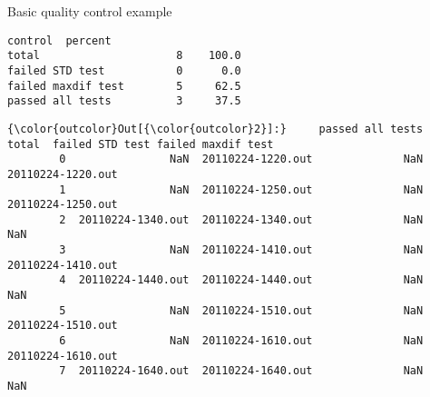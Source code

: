 \documentclass[11pt]{article}
\begin{document}
\begin{block}{Basic quality control example}
\begin{Verbatim}[commandchars=\\\{\}]
                    control  percent
total                     8    100.0
failed STD test           0      0.0
failed maxdif test        5     62.5
passed all tests          3     37.5

    \end{Verbatim}

\begin{Verbatim}[commandchars=\\\{\}]
{\color{outcolor}Out[{\color{outcolor}2}]:}     passed all tests              total  failed STD test failed maxdif test
        0                NaN  20110224-1220.out              NaN  20110224-1220.out
        1                NaN  20110224-1250.out              NaN  20110224-1250.out
        2  20110224-1340.out  20110224-1340.out              NaN                NaN
        3                NaN  20110224-1410.out              NaN  20110224-1410.out
        4  20110224-1440.out  20110224-1440.out              NaN                NaN
        5                NaN  20110224-1510.out              NaN  20110224-1510.out
        6                NaN  20110224-1610.out              NaN  20110224-1610.out
        7  20110224-1640.out  20110224-1640.out              NaN                NaN
\end{Verbatim}
            \end{block}
\end{document}
